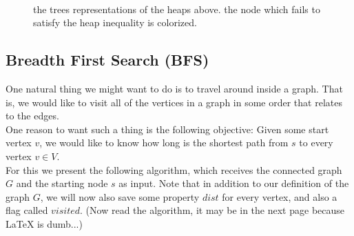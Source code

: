 \begin{figure}[h]
  \centering
  \begin{subfigure}[b]{0.25\textwidth}
         \\ 
  \end{subfigure}
\begin{subfigure}[b]{0.49\textwidth}       
\end{subfigure}
  \caption{the trees representations of the heaps above. the node which fails to satisfy the heap inequality is colorized.}
\end{figure}

\subsection{Breadth First Search (BFS)}

One natural thing we might want to do is to travel around inside a graph. That is, we would like to visit all of the vertices in a graph in some order that relates to the edges. \\ 
One reason to want such a thing is the following objective: Given some start vertex $v$, we would like to know how long is the shortest path from $s$ to every vertex $v\in V$. \\ 
For this we present the following algorithm, which receives the connected graph $G$ and the starting node $s$ as input. Note that in addition to our definition of the graph $G$, we will now also save some property $dist$ for every vertex, and also a flag called $visited$.  (Now read the algorithm, it may be in the next page because LaTeX is dumb...)

